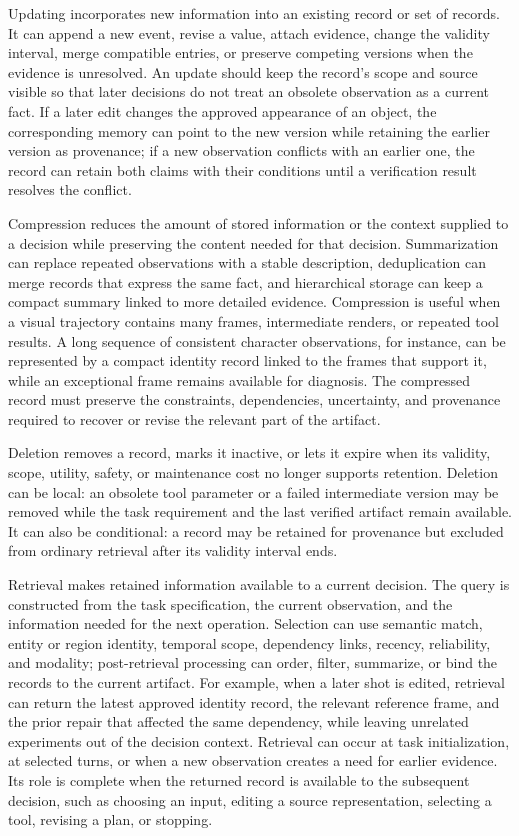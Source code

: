 Updating incorporates new information into an existing record or set of records. It can append a new event, revise a value, attach evidence, change the validity interval, merge compatible entries, or preserve competing versions when the evidence is unresolved. An update should keep the record's scope and source visible so that later decisions do not treat an obsolete observation as a current fact. If a later edit changes the approved appearance of an object, the corresponding memory can point to the new version while retaining the earlier version as provenance; if a new observation conflicts with an earlier one, the record can retain both claims with their conditions until a verification result resolves the conflict.

Compression reduces the amount of stored information or the context supplied to a decision while preserving the content needed for that decision. Summarization can replace repeated observations with a stable description, deduplication can merge records that express the same fact, and hierarchical storage can keep a compact summary linked to more detailed evidence. Compression is useful when a visual trajectory contains many frames, intermediate renders, or repeated tool results. A long sequence of consistent character observations, for instance, can be represented by a compact identity record linked to the frames that support it, while an exceptional frame remains available for diagnosis. The compressed record must preserve the constraints, dependencies, uncertainty, and provenance required to recover or revise the relevant part of the artifact.

Deletion removes a record, marks it inactive, or lets it expire when its validity, scope, utility, safety, or maintenance cost no longer supports retention. Deletion can be local: an obsolete tool parameter or a failed intermediate version may be removed while the task requirement and the last verified artifact remain available. It can also be conditional: a record may be retained for provenance but excluded from ordinary retrieval after its validity interval ends.

Retrieval makes retained information available to a current decision. The query is constructed from the task specification, the current observation, and the information needed for the next operation. Selection can use semantic match, entity or region identity, temporal scope, dependency links, recency, reliability, and modality; post-retrieval processing can order, filter, summarize, or bind the records to the current artifact. For example, when a later shot is edited, retrieval can return the latest approved identity record, the relevant reference frame, and the prior repair that affected the same dependency, while leaving unrelated experiments out of the decision context. Retrieval can occur at task initialization, at selected turns, or when a new observation creates a need for earlier evidence. Its role is complete when the returned record is available to the subsequent decision, such as choosing an input, editing a source representation, selecting a tool, revising a plan, or stopping.

